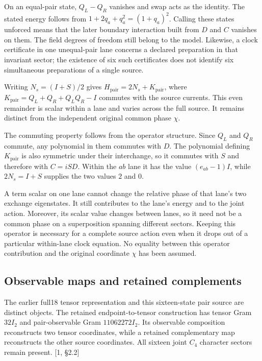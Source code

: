 \documentclass[10pt,twocolumn,letterpaper]{article}
\begin{document}
On an equal-pair state, $Q_L-Q_R$ vanishes and swap acts as the identity. The stated energy follows from $1+2q_a+q_a^2=(1+q_a)^2$. Calling these states unforced means that the later boundary interaction built from $D$ and $C$ vanishes on them. The field degrees of freedom still belong to the model. Likewise, a clock certificate in one unequal-pair lane concerns a declared preparation in that invariant sector; the existence of six such certificates does not identify six simultaneous preparations of a single source.



Writing $N_s=(I+S)/2$ gives $H_{\mathrm{pair}}=2N_s+K_{\mathrm{pair}}$, where $K_{\mathrm{pair}}=Q_L+Q_R+Q_LQ_R-I$ commutes with the source currents. This even remainder is scalar within a lane and varies across the full source. It remains distinct from the independent original common phase $\chi$.

The commuting property follows from the operator structure. Since $Q_L$ and $Q_R$ commute, any polynomial in them commutes with $D$. The polynomial defining $K_{\mathrm{pair}}$ is also symmetric under their interchange, so it commutes with $S$ and therefore with $C=iSD$. Within the $ab$ lane it has the value $(e_{ab}-1)I$, while $2N_s=I+S$ supplies the two values $2$ and $0$.

A term scalar on one lane cannot change the relative phase of that lane's two exchange eigenstates. It still contributes to the lane's energy and to the joint action. Moreover, its scalar value changes between lanes, so it need not be a common phase on a superposition spanning different sectors. Keeping this operator is necessary for a complete source action even when it drops out of a particular within-lane clock equation. No equality between this operator contribution and the original coordinate $\chi$ has been assumed.



\subsection{Observable maps and retained complements}
The earlier full18 tensor representation and this sixteen-state pair source are distinct objects. The retained endpoint-to-tensor construction has tensor Gram $32I_2$ and pair-observable Gram $11062272I_2$. Its observable composition reconstructs two tensor coordinates, while a retained complementary map reconstructs the other source coordinates. All sixteen joint $C_4$ character sectors remain present. [1, \S2.2]
\end{document}
